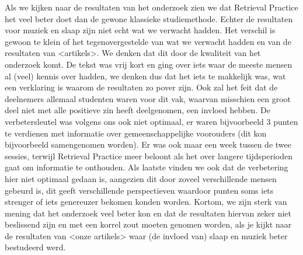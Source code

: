\documentclass{hogent-article}
\begin{document}
Als we kijken naar de resultaten van het onderzoek zien we dat Retrieval Practice het veel beter doet dan de gewone klassieke studiemethode. Echter de resultaten voor muziek en slaap zijn niet echt wat we verwacht hadden. Het verschil is gewoon te klein of het tegenovergestelde van wat we verwacht hadden en van de resultaten van <artikels>. We denken dat dit door de kwaliteit van het onderzoek komt. De tekst was vrij kort en ging over iets waar de meeste mensen al (veel) kennis over hadden, we denken dus dat het iets te makkelijk was, wat een verklaring is waarom de resultaten zo pover zijn. Ook zal het feit dat de deelnemers allemaal studenten waren voor dit vak, waarvan misschien een groot deel niet met alle positieve zin heeft deelgenomen, een invloed hebben. De verbetersleutel was volgens ons ook niet optimaal, er waren bijvoorbeeld 3 punten te verdienen met informatie over gemeenschappelijke voorouders (dit kon bijvoorbeeld samengenomen worden). Er was ook maar een week tussen de twee sessies, terwijl Retrieval Practice meer beloont als het over langere tijdsperioden gaat om informatie te onthouden.  Als laatste vinden we ook dat de verbetering hier niet optimaal gedaan is, aangezien dit door zoveel verschillende mensen gebeurd is, dit geeft verschillende perspectieven waardoor punten soms iets strenger of iets genereuzer bekomen konden worden. Kortom, we zijn sterk van mening dat het onderzoek veel beter kon en dat de resultaten hiervan zeker niet beslissend zijn en met een korrel zout moeten genomen worden, als je kijkt naar de resultaten van <onze artikels> waar (de invloed van) slaap en muziek beter bestudeerd werd.


\printbibliography[heading=bibintoc]
\end{document}
